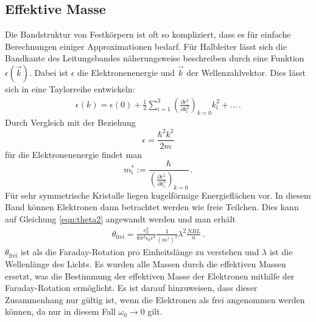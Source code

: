 \subsection{Effektive Masse}
\label{subsec:effmass}
Die Bandstruktur von Festkörpern ist oft so kompliziert, dass es für einfache Berechnungen
einiger Approximationen bedarf. Für Halbleiter lässt sich die Bandkante des Leitungsbandes
näherungsweise beschreiben durch eine Funktion $\epsilon(\vec{k})$. Dabei ist
$\epsilon$ die Elektronenenergie und $\vec{k}$ der Wellenzahlvektor. Dies lässt sich
in eine Taylorreihe entwickeln:
\begin{align}
  \epsilon(k) = \epsilon (0) + \frac{1}{2} \sum_{i=1}^3 \left(\frac{\partial \epsilon^2}{\partial k^2_{\mathrm{i}}}\right)_{k=0} k_{\mathrm{i}}^2 + ... \,.
  \label{eqn:taylor}
\end{align}
Durch Vergleich mit der Beziehung
\begin{equation}
  \epsilon = \frac{\hbar^2 k^2}{2m}
  \label{eqn:elektronenergie}
\end{equation}
für die Elektronenenergie findet man
\begin{equation}
   m^*_{\mathrm{i}} := \frac{\hbar}{\left(\frac{\partial \epsilon^2}{\partial k^2_{\mathrm{i}}}\right)_{k=0}} \,.
   \label{eqn:effmass}
\end{equation}
Für sehr symmetrische Kristalle liegen kugelförmige Energieflächen vor. In diesem
Band können Elektronen dann betrachtet werden wie freie Teilchen. Dies kann auf
Gleichung \eqref{eqn:theta2} angewandt werden und man erhält
\begin{align}
  \theta_{\mathrm{frei}} = \frac{e^3_0}{8 \pi^2 \epsilon_0 c^3}\frac{1}{\left(m^{*}\right)^2} \lambda^2 \frac{NBL}{n} \,.
  \label{eqn:theta_frei}
\end{align}
$\theta_{\mathrm{frei}}$ ist als die Faraday-Rotation pro Einheitslänge zu verstehen und
$\lambda$ ist die Wellenlänge des Lichts. Es wurden alle Massen durch die effektiven
Massen ersetzt, was die Bestimmung der effektiven Masse der Elektronen mithilfe der
Faraday-Rotation ermöglicht. Es ist darauf hinzuweisen, dass dieser Zusammenhang nur
gültig ist, wenn die Elektronen als frei angenommen werden können, da nur in diesem
Fall $\omega_0 \rightarrow 0$ gilt.
